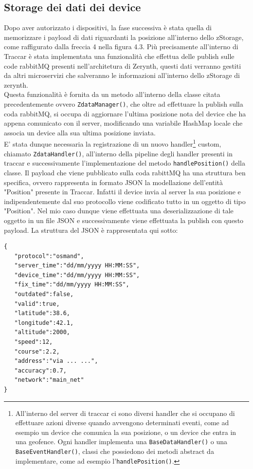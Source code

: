 \documentclass[a4paper,titlepage,12pt]{book}
\begin{document}
\subsection{\sffamily
Storage dei dati dei device}
Dopo aver autorizzato i dispositivi, la fase successiva è stata quella di memorizzare i payload di dati riguardanti la posizione all'interno dello zStorage, come raffigurato dalla freccia 4 nella figura 4.3. Più precisamente all'interno di Traccar è stata implementata una funzionalità che effettua delle publish sulle code rabbitMQ presenti nell'architetura di Zerynth, questi dati verranno gestiti da altri microservizi che salveranno le informazioni all'interno dello zStorage di zerynth.\\
Questa funzionalità è fornita da un metodo all'interno della classe citata precedentemente ovvero \texttt{ZdataManager()}, che oltre ad effettuare la publish sulla coda rabbitMQ, si occupa di aggiornare l'ultima posizione nota del device che ha appena comunicato con il server, modificando una variabile HashMap locale che associa un device alla sua ultima posizione inviata.\\
E' stata dunque necessaria la registrazione di un nuovo handler\footnote{\sffamily
All'interno del server di traccar ci sono diversi handler che si occupano di effettuare azioni diverse quando avvengono determinati eventi, come ad esempio un device che comunica la sua posizione, o un device che entra in una geofence. Ogni handler implementa una \texttt{BaseDataHandler()} o una \texttt{BaseEventHandler()}, classi che possiedono dei metodi abstract da implementare, come ad esempio l'\texttt{handlePosition()}.} custom, chiamato \texttt{ZdataHandler()}, all'interno della pipeline degli handler presenti in traccar e successivamente l'implementazione del metodo \texttt{handlePosition()} della classe.
Il payload che viene pubblicato sulla coda rabittMQ ha una struttura ben specifica, ovvero rappresenta in formato JSON la modellazione dell'entità "Position" presente in Traccar. Infatti il device invia al server la sua posizione e indipendentemente dal suo protocollo viene codificato tutto in un oggetto di tipo "Position". Nel mio caso dunque viene effettuata una deserializzazione di tale oggetto in un file JSON e successivamente viene effettuata la publish con questo payload. La struttura del JSON è rappresentata qui sotto:

\begin{verbatim}
{
   "protocol":"osmand",
   "server_time":"dd/mm/yyyy HH:MM:SS",
   "device_time":"dd/mm/yyyy HH:MM:SS",
   "fix_time":"dd/mm/yyyy HH:MM:SS",
   "outdated":false,
   "valid":true,
   "latitude":38.6,
   "longitude":42.1,
   "altitude":2000,
   "speed":12,
   "course":2.2,
   "address":"via ... ...",
   "accuracy":0.7,
   "network":"main_net"
}
\end{verbatim}
\end{document}
